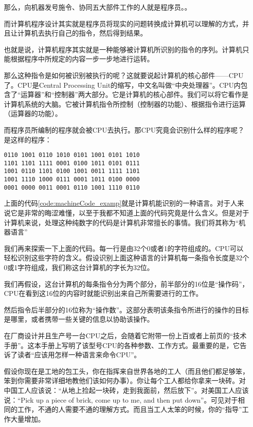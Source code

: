 那么，向机器发号施令、协同五大部件工作的人就是程序员。。

而计算机程序设计其实就是程序员将现实的问题转换成计算机可以理解的方式，并且让计算机去执行自己的指令，然后得到结果。

也就是说，计算机程序其实就是一种能够被计算机所识别的指令的序列。计算机只能根据程序中所规定的内容一步一步地进行运转。

那么这种指令是如何被识别被执行的呢？这就要说起计算机的核心部件——CPU了。CPU是Central Processing Unit的缩写，中文名叫做“中央处理器”。CPU内包含了“运算器”和“控制器”两大部分。它是计算机的核心部件。我们可以将它看作是计算机系统的大脑。它被计算机指令所控制（控制器的功能）、根据指令进行运算（运算器的功能）。

而程序员所编制的程序就会被CPU去执行。那CPU究竟会识别什么样的程序呢？是这样的程序：

\begin{lstlisting}[caption=机器代码, label=code:machineCode_examp]
0110 1001 0110 1010 0101 1001 0101 1010
1101 1101 1111 0001 0100 1011 0101 0111
1001 0110 1101 0100 1001 0011 1111 1101
1001 1110 1000 0111 0001 1011 0100 0000
0001 0000 0011 0001 0110 1001 1110 0110
\end{lstlisting}

上面的代码\ref{code:machineCode_examp}就是计算机能识别的一种语言。对于人来说它是非常的晦涩难懂，以至于我都不知道上面的代码究竟是什么含义。但是对于计算机来说，处理这种纯数字的代码是计算机非常擅长的事情。我们将其称为“机器语言”

我们再来探索一下上面的代码。每一行是由32个0或者1的字符组成的。CPU可以轻松识别这些字符的含义。假设识别上面这种语言的计算机每一条指令长度是32个0或1字符组成，我们称这台计算机的字长为32位。

我们再假设，这台计算机的每条指令分为两个部分，前半部分的16位是“操作码”，CPU在看到这16位的内容时就能识别出来自己所需要进行的工作。

然后指令后半部分的16位称为“操作数”。这部分表明该条指令所进行的操作的目标是哪里，或者携带一些关键的信息以协助该操作。

在厂商设计并且生产号一台CPU之后，会随着它附带一份上百或者上前页的“技术手册”。这本手册上写明了该型号CPU的各种参数、工作方式。最重要的是，它告诉了读者“应该用怎样一种语言来命令CPU”。

假设你现在是工地的包工头，你在指挥来自世界各地的工人（而且他们都足够笨，笨到你需要非常详细地教他们该如何办事）。你让每个工人都给你拿来一块砖。对中国工人应该说：“从地上捡起一块砖，走到我面前，然后放下”。对美国工人应该说：“Pick up a piece of brick, come up to me, and then put down”。可见对于相同的工作，不通的人需要不通的理解方式。而且当工人太笨的时候，你的“指导”工作大量增加。

